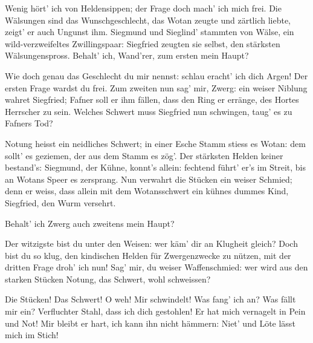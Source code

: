 \begin{drama}
\Mimespeaks


Wenig hört' ich
von Heldensippen;
der Frage doch mach' ich mich frei.
Die Wälsungen sind
das Wunschgeschlecht,
das Wotan zeugte
und zärtlich liebte,
zeigt' er auch Ungunst ihm.
Siegmund und Sieglind'
stammten von Wälse,
ein wild-verzweifeltes
Zwillingspaar:
Siegfried zeugten sie selbst,
den stärksten Wälsungenspross.
Behalt' ich, Wand'rer,
zum ersten mein Haupt?

\Wandererspeaks


Wie doch genau
das Geschlecht du mir nennst:
schlau eracht' ich dich Argen!
Der ersten Frage
wardst du frei.
Zum zweiten nun sag' mir, Zwerg:
ein weiser Niblung
wahret Siegfried;
Fafner soll er ihm fällen,
dass den Ring er erränge,
des Hortes Herrscher zu sein.
Welches Schwert
muss Siegfried nun schwingen,
taug' es zu Fafners Tod?

\Mimespeaks


Notung heisst
ein neidliches Schwert;
in einer Esche Stamm
stiess es Wotan:
dem sollt' es geziemen,
der aus dem Stamm es zög'.
Der stärksten Helden
keiner bestand's:
Siegmund, der Kühne,
konnt's allein:
fechtend führt' er's im Streit,
bis an Wotans Speer es zersprang.
Nun verwahrt die Stücken
ein weiser Schmied;
denn er weiss, dass allein
mit dem Wotansschwert
ein kühnes dummes Kind,
Siegfried, den Wurm versehrt.


Behalt' ich Zwerg
auch zweitens mein Haupt?

\Wandererspeaks


Der witzigste bist du
unter den Weisen:
wer käm' dir an Klugheit gleich?
Doch bist du so klug,
den kindischen Helden
für Zwergenzwecke zu nützen,
mit der dritten Frage
droh' ich nun!
Sag' mir, du weiser
Waffenschmied:
wer wird aus den starken Stücken
Notung, das Schwert, wohl schweissen?

\Mimespeaks


Die Stücken! Das Schwert!
O weh! Mir schwindelt!
Was fang' ich an?
Was fällt mir ein?
Verfluchter Stahl,
dass ich dich gestohlen!
Er hat mich vernagelt
in Pein und Not!
Mir bleibt er hart,
ich kann ihn nicht hämmern:
Niet' und Löte
lässt mich im Stich!


\end{drama}
